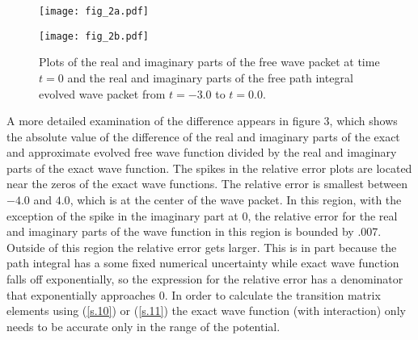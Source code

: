 \documentclass[aps,prc,reprint,noshowpacs,groupedaddress,onecolumn]{revtex4}
\begin{document}
\begin{figure}
\caption{Plots of the real and imaginary parts of the free wave packet
at time $t=0$ and the real and imaginary parts of the free path integral
evolved wave packet  
from $t=-3.0$ to $t=0.0$.}
\begin{minipage}[t]{.45\linewidth}
\centering
\texttt{[image: fig\_2a.pdf]}  
\end{minipage}
\begin{minipage}[t]{.45\linewidth}
\centering
\texttt{[image: fig\_2b.pdf]}  
\end{minipage}
\label{figure 2}
\end{figure}  
A more detailed examination of the difference appears in figure 3,
which shows the absolute value of the difference of the real and
imaginary parts of the exact and approximate evolved free wave
function divided by the real and imaginary parts of the exact wave
function.  The spikes in the relative error plots are located near the
zeros of the exact wave functions.  The relative error is smallest
between $-4.0$ and $4.0$, which is at the center of the wave packet.
In this region, with the exception of the spike in the imaginary part
at 0, the relative error for the real and imaginary parts of the wave
function in this region is bounded by .007.  Outside of this region
the relative error gets larger.  This is in part because the
path integral has a some fixed numerical uncertainty while   
exact wave function falls off exponentially, so the expression for
the relative error has a denominator that exponentially
approaches 0.    In order to calculate the transition matrix elements
using (\ref{s.10}) or (\ref{s.11}) the exact wave function (with
interaction) only needs to be accurate only in the range of the
potential.
\end{document}
